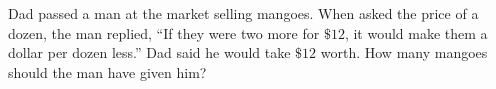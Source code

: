 Dad passed a man at the market selling mangoes. When asked the price of a dozen, the man replied, ``If they were two more for $\$12$, it would make them a dollar per dozen less.'' Dad said he would take $\$12$ worth. How many mangoes should the man have given him?

